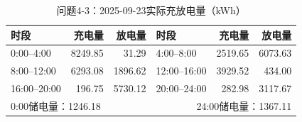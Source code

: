 \begin{table}[H]\centering\small
\caption{问题4-3：2025-09-23实际充放电量（kWh）}
\label{tab:q4_3_0923_storage}
\begin{tabular}{lrrlrr}\toprule
时段 & 充电量 & 放电量 & 时段 & 充电量 & 放电量\\\midrule
0:00--4:00 & 8249.85 & 31.29 & 4:00--8:00 & 2519.65 & 6073.63 \\
8:00--12:00 & 6293.08 & 1896.62 & 12:00--16:00 & 3929.52 & 434.00 \\
16:00--20:00 & 196.75 & 5730.12 & 20:00--24:00 & 282.98 & 3117.67 \\
\midrule\multicolumn{3}{l}{0:00储电量：1246.18} & \multicolumn{3}{r}{24:00储电量：1367.11}\\
\bottomrule\end{tabular}\end{table}
